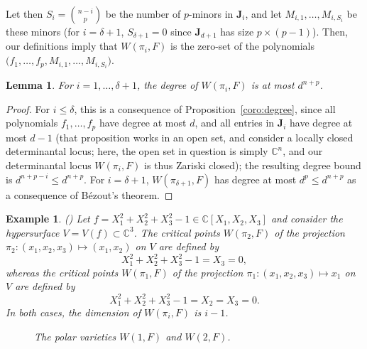 \documentclass[12pt]{article}
\def\C{\mathbb{C}}
\def\Wi{W(\pi_i,F)}
\newtheorem{lemma}[theorem]{Lemma}
\newtheorem{ex}[theorem]{Example}
\newtheorem{prop}[theorem]{Proposition}
\begin{document}
Let then $S_i =\binom{n-i}{p}$ be the number of $p$-minors in $\bm
J_i$, and let $M_{i,1},\hdots,M_{i,S_i}$ be these minors (for
$i=\delta+1$, $S_{\delta+1}=0$ since $\bm J_{d+1}$ has size $p \times
(p-1)$). Then, our definitions imply that $\Wi$ is the zero-set of the
polynomials $\big(f_1,\hdots,f_p,M_{i,1},\hdots,M_{i,S_{i}}\big)$.

\begin{lemma}
  For $i=1,\dots,\delta+1$, the degree of $W(\pi_i,F)$ is at most
  $d^{n+p}$.
\end{lemma}
\begin{proof}
  For $i \le \delta$, this is a consequence of
  Proposition~\ref{coro:degree}, since all polynomials $f_1,\dots,f_p$
  have degree at most $d$, and all entries in $\bm J_i$ have degree at
  most $d-1$ (that proposition works in an open set, and consider a
  locally closed determinantal locus; here, the open set in question
  is simply $\C^n$, and our determinantal locus $W(\pi_i,F)$ is thus
  Zariski closed); the resulting degree bound is $d^{n+p-i} \le
  d^{n+p}$.  For $i=\delta+1$, $W(\pi_{\delta+1},F)$ has degree at
  most $d^p \le d^{n+p}$ as a consequence of B\'ezout's theorem.
\end{proof}

 

\begin{ex} (\cite[Example 3.1]{TWT})
  Let $f = X_1^2 + X_2^2 + X_3^2-1\in \C[X_1,X_2,X_3]$ and consider
  the hypersurface $V=V(f) \subset \mathbb{C}^{3}$. The critical
  points $W(\pi_2,F)$ of the projection $\pi_2: (x_1,x_2,x_3) \mapsto
  (x_1,x_2)$ on $V$ are defined by
  \[
  X_1^2 + X_2^2 + X_3^2-1=X_3=0,
  \]
  whereas the critical points $W(\pi_1,F)$ of the projection $\pi_1: (x_1,x_2,x_3)
  \mapsto x_1$ on $V$ are defined by
  \[
  X_1^2 + X_2^2 + X_3^2-1=X_2=X_3=0.
  \]
  In both cases, the dimension of $W(\pi_i,F)$ is $i-1$.
  \begin{figure}[h]
    \centering
    \caption{The polar varieties $W(1, F)$ and $W(2, F)$.}
\end{figure}
\end{ex}

\end{document}
